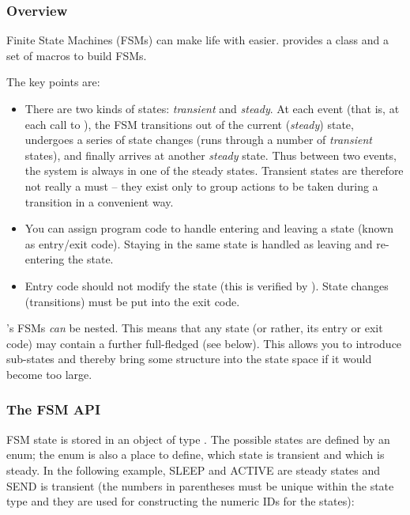 \subsubsection{Overview}

Finite State Machines (FSMs)
can make life with  easier. {\opp} provides a
class and a set of macros to build FSMs.

The key points are:
\begin{itemize}
\item{There are two kinds of states:
    \textit{transient} and
    \textit{steady}. At each event (that is, at
    each call to ), the FSM transitions out of
    the current (\textit{steady}) state, undergoes a series of state
    changes (runs through a number of \textit{transient} states), and
    finally arrives at another \textit{steady} state. Thus between two
    events, the system is always in one of the steady states.
    Transient states are therefore not really a must -- they exist
    only to group actions to be taken during a transition in a
    convenient way.}
\item{You can assign program code to handle entering and leaving a state
    (known as entry/exit code).
    Staying in the same state is handled as leaving and re-entering
    the state.}
\item{Entry code should not modify the state (this is verified by
    {\opp}).  State changes (transitions) must be put into the exit
    code.}
\end{itemize}

{\opp}'s FSMs \textit{can} be nested. This means
that any state (or rather, its entry or exit code) may contain a
further full-fledged  (see below). This allows you
to introduce sub-states and thereby bring some structure into the
state space if it would become too large.


\subsubsection{The FSM API}


FSM state is stored in an object of type . The possible states
are defined by an enum; the enum is also a place to define, which
state is transient and which is steady. In the following example, SLEEP
and ACTIVE are steady states and SEND is transient (the numbers
in parentheses must be unique within the state type and they are used
for constructing the numeric IDs for the states):

